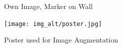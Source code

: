 \documentclass[a4paper,twocolumn]{article}
\begin{document}
\begin{figure}[htbp]
    \caption{Own Image, Marker on Wall \cite{tim-schweitzer}}
    \label{fig:example-pappendix3}
\end{figure}

\begin{figure}[htbp]
    \centering
    \texttt{[image: img\_alt/poster.jpg]}
    \caption{Poster used for Image Augmentation\cite{v_speed}}
    \label{fig:img-poster}
\end{figure}
\end{document}
